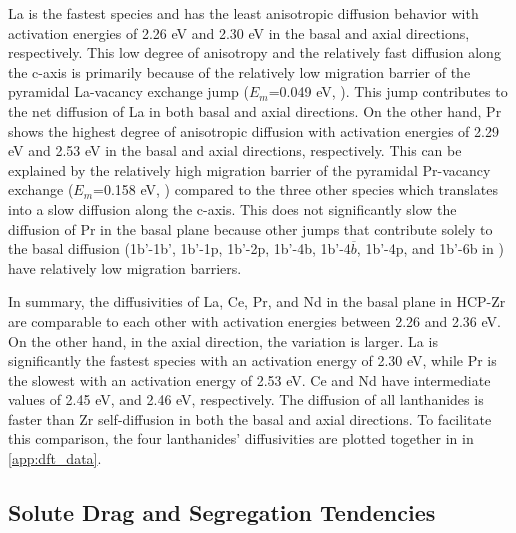 \documentclass[preprint,12pt]{elsarticle}
\begin{document}
La is the fastest species and has the least anisotropic diffusion behavior with activation energies of 2.26 eV and 2.30 eV in the basal and axial directions, respectively. This low degree of anisotropy and the relatively fast diffusion along the c-axis is primarily because of the relatively low migration barrier of the pyramidal La-vacancy exchange jump ($E_m$=0.049 eV, ). This jump contributes to the net diffusion of La in both basal and axial directions. On the other hand, Pr shows the highest degree of anisotropic diffusion with activation energies of 2.29 eV and 2.53 eV in the basal and axial directions, respectively. This can be explained by the relatively high migration barrier of the pyramidal Pr-vacancy exchange ($E_m$=0.158 eV, ) compared to the three other species which translates into a slow diffusion along the c-axis. This does not significantly slow the diffusion of Pr in the basal plane because other jumps that contribute solely to the basal diffusion (1b'-1b', 1b'-1p, 1b'-2p, 1b'-4b, 1b'-4$\overline{b}$, 1b'-4p, and 1b'-6b in ) have relatively low migration barriers.

In summary, the diffusivities of La, Ce, Pr, and Nd in the basal plane in HCP-Zr are comparable to each other with activation energies between 2.26 and 2.36 eV. On the other hand, in the axial direction, the variation is larger. La is significantly the fastest species with an activation energy of 2.30 eV, while Pr is the slowest with an activation energy of 2.53 eV. Ce and Nd have intermediate values of 2.45 eV, and 2.46 eV, respectively. The diffusion of all lanthanides is faster than Zr self-diffusion in both the basal and axial directions. To facilitate this comparison, the four lanthanides' diffusivities are plotted together in  in \ref{app:dft_data}.

\FloatBarrier

\subsection{Solute Drag and Segregation Tendencies}
\label{subsection_drag}
\end{document}
